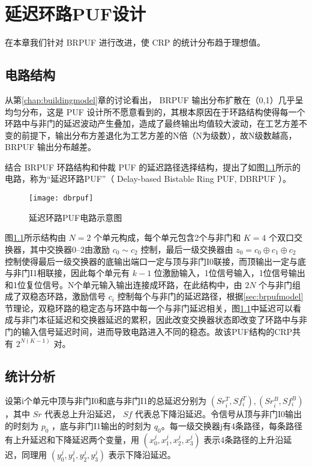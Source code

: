
\chapter{延迟环路PUF设计}\label{chap:dbrpuf}
在本章我们针对 BRPUF 进行改进，使 CRP 的统计分布趋于理想值。

\section{电路结构}\label{sec:dbrpuf_scheme}
从第\ref{chap:buildingmodel}章的讨论看出， BRPUF 输出分布扩散在（0,1）几乎呈均匀分布，这是 PUF 设计所不愿意看到的，其根本原因在于环路结构使得每一个环路中与非门的延迟波动产生叠加，造成了最终输出均值较大波动，在工艺方差不变的前提下，输出分布方差退化为工艺方差的N倍（N为级数），故N级数越高， BRPUF 输出分布越差。

结合 BRPUF 环路结构和仲裁 PUF 的延迟路径选择结构，提出了如图\ref{fig:dbrpuf}所示的电路，称为``延迟环路PUF''（ Delay-based Bistable Ring PUF, DBRPUF ）。

\begin{figure}[htb]
\centering
\texttt{[image: dbrpuf]}
\caption{延迟环路PUF电路示意图}
\label{fig:dbrpuf}
\end{figure}

图\ref{fig:dbrpuf}所示结构由 $ N=2 $ 个单元构成，每个单元包含2个与非门和 $ K=4 $ 个双口交换器，其中交换器0--2由激励 $ c_0\sim c_2 $ 控制，最后一级交换器由 $ z_0=c_0\oplus c_1\oplus c_2  $ 控制使得最后一级交换器的底输出端口一定与顶与非门I0联接，而顶输出一定与底与非门I1相联接，因此每个单元有 $ k-1 $ 位激励输入，1位信号输入，1位信号输出和1位复位信号。N个单元输入输出连接成环路，在此结构中，由 $ 2N $ 个与非门组成了双稳态环路，激励信号 $ c_i $ 控制每个与非门的延迟路径，根据\ref{sec:brpufmodel}节理论，双稳环路的稳定态与环路中每一个与非门延迟相关，图\ref{fig:dbrpuf}中延迟可以看成与非门本征延迟和交换器延迟的累积，因此改变交换器状态即改变了环路中与非门的输入信号延迟时间，进而导致电路进入不同的稳态。故该PUF结构的CRP共有 $ 2^{N(K-1)} $ 对。

\section{统计分析}\label{sec:dbrpuf_stat}
设第i个单元中顶与非门I0和底与非门I1的总延迟分别为 $ (Sr_i^T,Sf_i^T),(Sr_i^B,Sf_i^B) $，其中 $ Sr $ 代表总上升沿延迟， $ Sf $ 代表总下降沿延迟。令信号从顶与非门I0输出的时刻为 $ p_0 $ ，底与非门I1输出的时刻为 $ q_0 $。每一级交换器j有4条路径，每条路径有上升延迟和下降延迟两个变量，用 $ (x_0^j,x_1^j,x_2^j,x_3^j) $ 表示4条路径的上升沿延迟，同理用 $ (y_0^j,y_1^j,y_2^j,y_3^j) $ 表示下降沿延迟。

